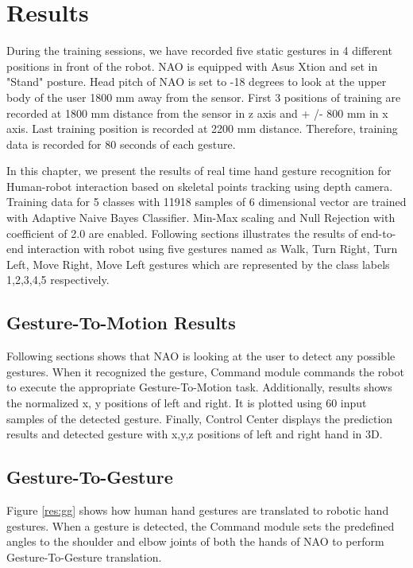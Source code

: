 \chapter{Results} \label{ch:result} During the training sessions, we have recorded five static gestures in 4 different positions in front of the robot. NAO is equipped with Asus Xtion and set in "Stand" posture. Head pitch of NAO is set to -18 degrees to look at the upper body of the user 1800 mm away from the sensor. First 3 positions of training are recorded at 1800 mm distance from the sensor in z axis and + /- 800 mm in x axis. Last training position is recorded at 2200 mm distance. Therefore, training data is recorded for 80 seconds of each gesture.

In this chapter, we present the results of real time hand gesture recognition for Human-robot interaction based on skeletal points tracking using depth camera. Training data for 5 classes with 11918 samples of 6 dimensional vector are trained with Adaptive Naive Bayes Classifier. Min-Max scaling and Null Rejection with coefficient of 2.0 are enabled. Following sections illustrates the results of end-to-end interaction with robot using five gestures named as Walk, Turn Right, Turn Left, Move Right, Move Left gestures which are represented by the class labels 1,2,3,4,5 respectively.


\section{Gesture-To-Motion Results} 
Following sections shows that NAO is looking at the user to detect any possible gestures. When it recognized the gesture, Command module commands the robot to execute the appropriate Gesture-To-Motion task. Additionally, results shows the normalized x, y positions of left and right. It is plotted using 60 input samples of the detected gesture. Finally, Control Center displays the prediction results and detected gesture with x,y,z positions of left and right hand in 3D.







\clearpage
\section{Gesture-To-Gesture} Figure \ref{res:gg} shows how human hand gestures are translated to robotic hand gestures. When a gesture is detected, the Command module sets the predefined angles to the shoulder and elbow joints of both the hands of NAO to perform Gesture-To-Gesture translation. 

